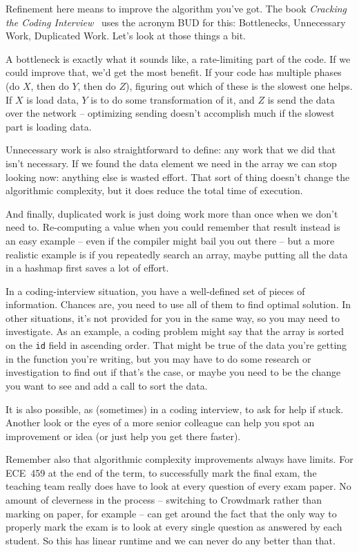 Refinement here means to improve the algorithm you've got. The book \textit{Cracking the Coding Interview}~\cite{mcdowell2015cracking} uses the acronym BUD for this: Bottlenecks, Unnecessary Work, Duplicated Work. Let's look at those things a bit.

A bottleneck is exactly what it sounds like, a rate-limiting part of the code. If we could improve that, we'd get the most benefit. If your code has multiple phases (do $X$, then do $Y$, then do $Z$), figuring out which of these is the slowest one helps. If $X$ is load data, $Y$ is to do some transformation of it, and $Z$ is send the data over the network -- optimizing sending doesn't accomplish much if the slowest part is loading data. 

Unnecessary work is also straightforward to define: any work that we did that isn't necessary. If we found the data element we need in the array we can stop looking now: anything else is wasted effort. That sort of thing doesn't change the algorithmic complexity, but it does reduce the total time of execution. 

And finally, duplicated work is just doing work more than once when we don't need to. Re-computing a value when you could remember that result instead is an easy example -- even if the compiler might bail you out there -- but a more realistic example is if you repeatedly search an array, maybe putting all the data in a hashmap first saves a lot of effort. 

In a coding-interview situation, you have a well-defined set of pieces of information. Chances are, you need to use all of them to find optimal solution. In other situations, it's not provided for you in the same way, so you may need to investigate. As an example, a coding problem might say that the array is sorted on the \texttt{id} field in ascending order. That might be true of the data you're getting in the function you're writing, but you may have to do some research or investigation to find out if that's the case, or maybe you need to be the change you want to see and add a call to sort the data.

It is also possible, as (sometimes) in a coding interview, to ask for help if stuck. Another look or the eyes of a more senior colleague can help you spot an improvement or idea (or just help you get there faster).

Remember also that algorithmic complexity improvements always have limits. For ECE~459 at the end of the term, to successfully mark the final exam, the teaching team really does have to look at every question of every exam paper. No amount of cleverness in the process -- switching to Crowdmark rather than marking on paper, for example -- can get around the fact that the only way to properly mark the exam is to look at every single question as answered by each student. So this has linear runtime and we can never do any better than that. 

